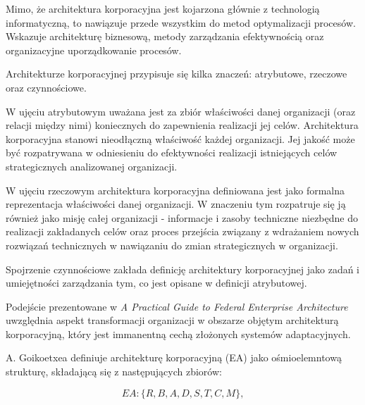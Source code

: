 Mimo, że architektura korporacyjna jest kojarzona głównie z technologią informatyczną, to nawiązuje przede wszystkim do metod optymalizacji procesów. Wskazuje architekturę biznesową, metody zarządzania efektywnością oraz organizacyjne uporządkowanie procesów. \cite{ArchKorpSzymSup}

Architekturze korporacyjnej przypisuje się kilka znaczeń: atrybutowe, rzeczowe oraz czynnościowe.

W ujęciu atrybutowym uważana jest za zbiór właściwości danej organizacji (oraz relacji między nimi) koniecznych do zapewnienia realizacji jej celów. Architektura korporacyjna stanowi nieodłączną właściwość każdej organizacji. Jej jakość może być rozpatrywana w odniesieniu do efektywności realizacji istniejących celów strategicznych analizowanej organizacji. \cite{ArchKorpSob}

W ujęciu rzeczowym architektura korporacyjna definiowana jest jako formalna reprezentacja właściwości danej organizacji. W znaczeniu tym rozpatruje się ją również jako misję całej organizacji - informacje i zasoby techniczne niezbędne do realizacji zakładanych celów oraz proces przejścia związany z wdrażaniem nowych rozwiązań technicznych w nawiązaniu do zmian strategicznych w organizacji. \cite{ArchKorpSob}

Spojrzenie czynnościowe zakłada definicję architektury korporacyjnej jako zadań i umiejętności zarządzania tym, co jest opisane w definicji atrybutowej. \cite{ArchKorpSzymSup}

Podejście prezentowane w \emph{A Practical Guide to Federal Enterprise Architecture} uwzględnia aspekt transformacji organizacji w obszarze objętym architekturą korporacyjną, który jest immanentną cechą złożonych systemów adaptacyjnych. \cite{ArchKorpSob} 

A. Goikoetxea definiuje architekturę korporacyjną (EA) jako ośmioelemntową strukturę, składającą się z następujących zbiorów:

\begin{center}
\begin{equation}EA: \{R, B, A, D, S, T, C, M\},\end{equation}
\end{center}


